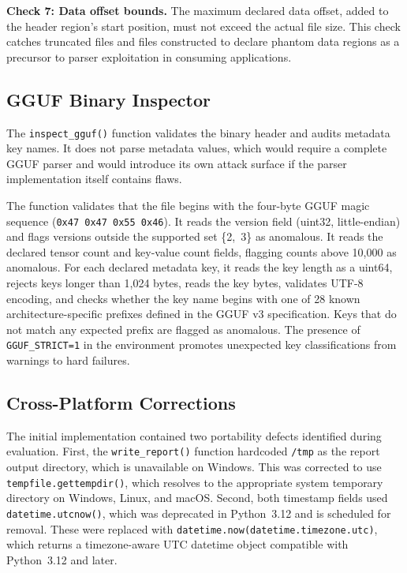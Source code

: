 \documentclass[preprint,12pt,twocolumn]{elsarticle}
\begin{document}
\textbf{Check 7: Data offset bounds.} The maximum declared data offset,
added to the header region's start position, must not exceed the actual
file size. This check catches truncated files and files constructed to
declare phantom data regions as a precursor to parser exploitation in
consuming applications.

\subsection{GGUF Binary Inspector}

The \texttt{inspect\_gguf()} function validates the binary header and
audits metadata key names. It does not parse metadata values, which would
require a complete GGUF parser and would introduce its own attack surface
if the parser implementation itself contains flaws.

The function validates that the file begins with the four-byte GGUF magic
sequence (\texttt{0x47 0x47 0x55 0x46}). It reads the version field
(uint32, little-endian) and flags versions outside the supported set
\{2,~3\} as anomalous. It reads the declared tensor count and key-value
count fields, flagging counts above 10,000 as anomalous. For each declared
metadata key, it reads the key length as a uint64, rejects keys longer than
1,024 bytes, reads the key bytes, validates UTF-8 encoding, and checks
whether the key name begins with one of 28 known architecture-specific
prefixes defined in the GGUF v3 specification. Keys that do not match any
expected prefix are flagged as anomalous. The presence of
\texttt{GGUF\_STRICT=1} in the environment promotes unexpected key
classifications from warnings to hard failures.

\subsection{Cross-Platform Corrections}

The initial implementation contained two portability defects identified
during evaluation. First, the \texttt{write\_report()} function hardcoded
\texttt{/tmp} as the report output directory, which is unavailable on
Windows. This was corrected to use \texttt{tempfile.gettempdir()}, which
resolves to the appropriate system temporary directory on Windows, Linux,
and macOS. Second, both timestamp fields used \texttt{datetime.utcnow()},
which was deprecated in Python~3.12 and is scheduled for removal. These
were replaced with \texttt{datetime.now(datetime.timezone.utc)}, which
returns a timezone-aware UTC datetime object compatible with Python~3.12
and later.
\end{document}
